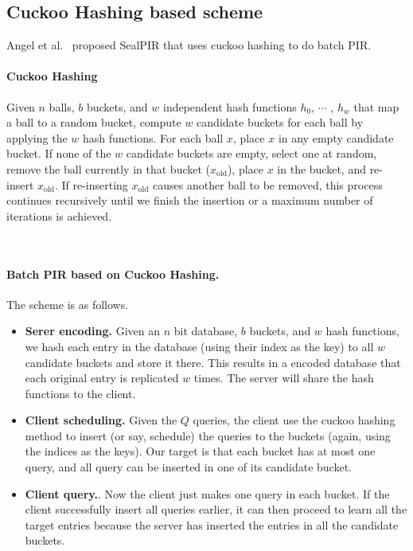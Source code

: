      
     
\subsection{Cuckoo Hashing based scheme~\cite{angel2018pir}}

Angel et al.~\cite{angel2018pir} proposed SealPIR that uses cuckoo hashing to do batch PIR.
    
    \paragraph{Cuckoo Hashing}
    \begin{definition}
        Given $n$ balls, $b$ buckets, and $w$
independent hash functions $h_0$, $\cdots$ , $h_{w}$ that map a ball to a
random bucket, compute $w$ candidate buckets for each ball by
applying the $w$ hash functions. For each ball $x$, place $x$ in any
empty candidate bucket. If none of the $w$ candidate buckets
are empty, select one at random, remove the ball currently in
that bucket ($x_{\text{old}}$), place $x$ in the bucket, and re-insert $x_{\text{old}}$. If
re-inserting $x_{\text{old}}$ causes another ball to be removed, this process
continues recursively until we finish the insertion or a maximum number of iterations is achieved.
    \end{definition} \
    
\paragraph{Batch PIR based on Cuckoo Hashing.}   
The scheme is as follows.
\begin{itemize}
    \item \textbf{Serer encoding.} Given an $n$ bit database, $b$ buckets, and $w$ hash functions, we hash each entry in the database (using their index as the key) to all $w$ candidate buckets and store it there.
    This results in a encoded database that each original entry is replicated $w$ times.
    The server will share the hash functions to the client.
    
    \item \textbf{Client scheduling.} Given the $Q$ queries, the client use the cuckoo hashing method to insert (or say, schedule) the queries to the buckets (again, using the indices as the keys).
    Our target is that each bucket has at most one query, and all query can be inserted in one of its candidate bucket.
    
    \item \textbf{Client query.}. Now the client just makes one query in each bucket. If the client successfully insert all queries earlier, it can then proceed to learn all the target entries because the server has inserted the entries in all the candidate buckets.
\end{itemize}

